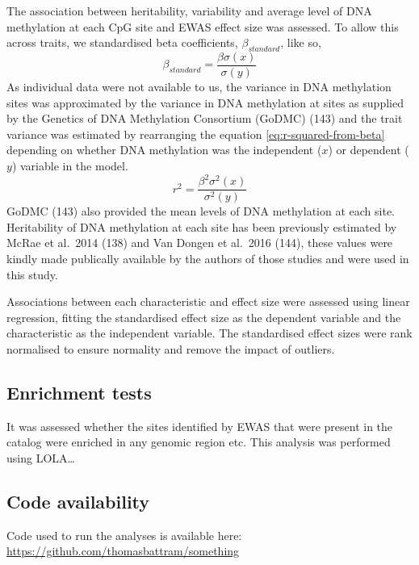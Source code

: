 \documentclass[11pt,oneside]{bristolthesis}
\begin{document}
The association between heritability, variability and average level of DNA methylation at each CpG site and EWAS effect size was assessed. To allow this across traits, we standardised beta coefficients, \(\beta_{standard}\), like so,
\begin{equation}
    \beta_{standard} = \frac{\beta\sigma(x)} {\sigma(y)}
    \label{eq:standardised-beta-coeffs}
\end{equation}
As individual data were not available to us, the variance in DNA methylation sites was approximated by the variance in DNA methylation at sites as supplied by the Genetics of DNA Methylation Consortium (GoDMC) (143) and the trait variance was estimated by rearranging the equation \eqref{eq:r-squared-from-beta} depending on whether DNA methylation was the independent (\(x\)) or dependent (\(y\)) variable in the model.
\begin{equation}
    r^2 = \frac{\beta^2\sigma^2(x)} {\sigma^2(y)}
    \label{eq:r-squared-from-beta}
\end{equation}
GoDMC (143) also provided the mean levels of DNA methylation at each site. Heritability of DNA methylation at each site has been previously estimated by McRae et al.~2014 (138) and Van Dongen et al.~2016 (144), these values were kindly made publically available by the authors of those studies and were used in this study.

Associations between each characteristic and effect size were assessed using linear regression, fitting the standardised effect size as the dependent variable and the characteristic as the independent variable. The standardised effect sizes were rank normalised to ensure normality and remove the impact of outliers.

\hypertarget{enrichment-tests}{%
\subsection{Enrichment tests}\label{enrichment-tests}}

It was assessed whether the sites identified by EWAS that were present in the catalog were enriched in any genomic region etc. This analysis was performed using LOLA\ldots{}

\hypertarget{code-availability-04}{%
\subsection{Code availability}\label{code-availability-04}}

Code used to run the analyses is available here: \url{https://github.com/thomasbattram/something}
\end{document}
